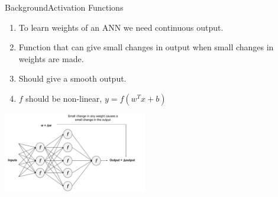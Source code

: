 \documentclass[handout]{beamer}
\begin{document}
\begin{frame}{Background}{Activation Functions}
  \begin{enumerate}
    \item To learn weights of an ANN we need continuous output. \\

    \item Function that can give small changes in output when small changes in weights are made. \\

    \item Should give a smooth output. \\

    \item $f$ should be non-linear, $y = f(w^Tx+b)$ \\
  \end{enumerate}
  \begin{center}
    \includegraphics[width=0.65\linewidth, height=3.5cm]{images/anns_change}
  \end{center}
\end{frame}
\end{document}
